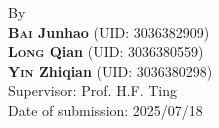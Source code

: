 \begin{titlepage}
\begin{center}
\vspace{20pt} %


\begin{center}
    {By\\
    \textbf{\textsc{Bai} Junhao}  ({UID: 3036382909})\\[10pt] 
    \textbf{\textsc{Long} Qian}   ({UID: 3036380559})\\[10pt]
    \textbf{\textsc{Yin} Zhiqian} ({UID: 3036380298})\\[10pt] 
    
    Supervisor: Prof. H.F. Ting\\ %
    Date of submission: 2025/07/18} %
\end{center}

\vfill
\end{center}

\end{titlepage}


